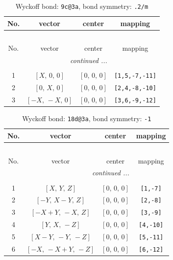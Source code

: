 \documentclass[fleqn,8pt]{jsarticle}
\begin{document}
\renewcommand{\arraystretch}{1.2}
\begin{longtable}{cccc}
\caption{Wyckoff bond: {\tt 9c@3a}, bond symmetry: {\tt .2/m}}
 \\
 \hline \hline
No. & vector & center & mapping \\ \hline \endfirsthead

\multicolumn{3}{l}{\tablename\ \thetable{}} \\
 \hline \hline
No. & vector & center & mapping \\ \hline \endhead

 \hline \hline
\multicolumn{3}{r}{\footnotesize\it continued ...} \\ \endfoot

 \hline \hline
\multicolumn{3}{r}{} \\ \endlastfoot

1 & $\left[ X,\, 0,\, 0 \right]$ & $\left[ 0,\, 0,\, 0 \right]$ & {\tt [1,5,-7,-11]} \\ \hline
2 & $\left[ 0,\, X,\, 0 \right]$ & $\left[ 0,\, 0,\, 0 \right]$ & {\tt [2,4,-8,-10]} \\ \hline
3 & $\left[ - X,\, - X,\, 0 \right]$ & $\left[ 0,\, 0,\, 0 \right]$ & {\tt [3,6,-9,-12]} \\
\end{longtable}
\renewcommand{\arraystretch}{1.2}
\begin{longtable}{cccc}
\caption{Wyckoff bond: {\tt 18d@3a}, bond symmetry: {\tt -1}}
 \\
 \hline \hline
No. & vector & center & mapping \\ \hline \endfirsthead

\multicolumn{3}{l}{\tablename\ \thetable{}} \\
 \hline \hline
No. & vector & center & mapping \\ \hline \endhead

 \hline \hline
\multicolumn{3}{r}{\footnotesize\it continued ...} \\ \endfoot

 \hline \hline
\multicolumn{3}{r}{} \\ \endlastfoot

1 & $\left[ X,\, Y,\, Z \right]$ & $\left[ 0,\, 0,\, 0 \right]$ & {\tt [1,-7]} \\ \hline
2 & $\left[ - Y,\, X - Y,\, Z \right]$ & $\left[ 0,\, 0,\, 0 \right]$ & {\tt [2,-8]} \\ \hline
3 & $\left[ - X + Y,\, - X,\, Z \right]$ & $\left[ 0,\, 0,\, 0 \right]$ & {\tt [3,-9]} \\ \hline
4 & $\left[ Y,\, X,\, - Z \right]$ & $\left[ 0,\, 0,\, 0 \right]$ & {\tt [4,-10]} \\ \hline
5 & $\left[ X - Y,\, - Y,\, - Z \right]$ & $\left[ 0,\, 0,\, 0 \right]$ & {\tt [5,-11]} \\ \hline
6 & $\left[ - X,\, - X + Y,\, - Z \right]$ & $\left[ 0,\, 0,\, 0 \right]$ & {\tt [6,-12]} \\
\end{longtable}
\end{document}
